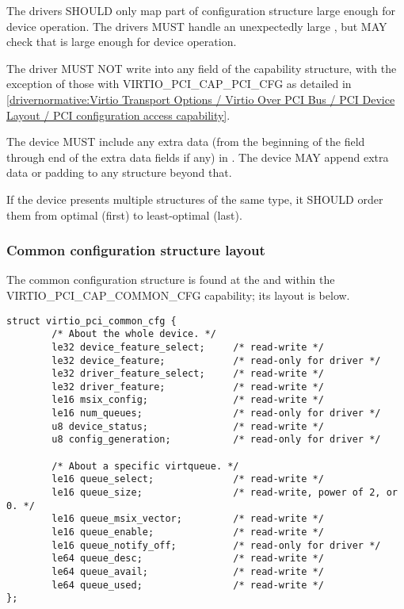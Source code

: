         The drivers SHOULD only map part of configuration structure
        large enough for device operation.  The drivers MUST handle
        an unexpectedly large , but MAY check that 
        is large enough for device operation.

The driver MUST NOT write into any field of the capability structure,
with the exception of those with  VIRTIO_PCI_CAP_PCI_CFG as
detailed in \ref{drivernormative:Virtio Transport Options / Virtio Over PCI Bus / PCI Device Layout / PCI configuration access capability}.


The device MUST include any extra data (from the beginning of the  field
through end of the extra data fields if any) in .
The device MAY append extra data
or padding to any structure beyond that.

If the device presents multiple structures of the same type, it SHOULD order
them from optimal (first) to least-optimal (last).

\subsubsection{Common configuration structure layout}\label{sec:Virtio Transport Options / Virtio Over PCI Bus / PCI Device Layout / Common configuration structure layout}

The common configuration structure is found at the  and  within the VIRTIO_PCI_CAP_COMMON_CFG capability; its layout is below.

\begin{lstlisting}
struct virtio_pci_common_cfg {
        /* About the whole device. */
        le32 device_feature_select;     /* read-write */
        le32 device_feature;            /* read-only for driver */
        le32 driver_feature_select;     /* read-write */
        le32 driver_feature;            /* read-write */
        le16 msix_config;               /* read-write */
        le16 num_queues;                /* read-only for driver */
        u8 device_status;               /* read-write */
        u8 config_generation;           /* read-only for driver */

        /* About a specific virtqueue. */
        le16 queue_select;              /* read-write */
        le16 queue_size;                /* read-write, power of 2, or 0. */
        le16 queue_msix_vector;         /* read-write */
        le16 queue_enable;              /* read-write */
        le16 queue_notify_off;          /* read-only for driver */
        le64 queue_desc;                /* read-write */
        le64 queue_avail;               /* read-write */
        le64 queue_used;                /* read-write */
};
\end{lstlisting}

